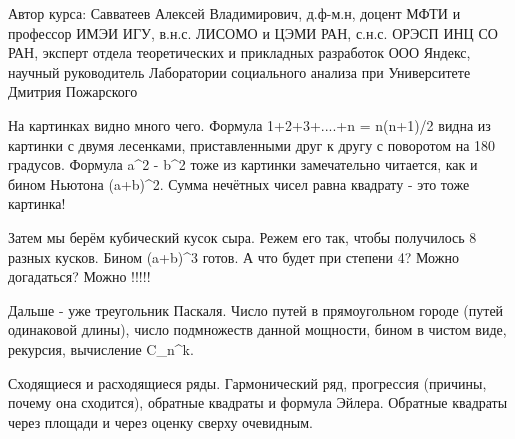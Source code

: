 Автор курса: Савватеев Алексей Владимирович, д.ф-м.н, доцент МФТИ и профессор 
ИМЭИ ИГУ, в.н.с. ЛИСОМО и ЦЭМИ РАН, с.н.с. ОРЭСП ИНЦ СО РАН, эксперт отдела 
теоретических и прикладных разработок ООО Яндекс, научный руководитель 
Лаборатории социального анализа при Университете Дмитрия Пожарского


На картинках видно много чего. Формула 1+2+3+....+n = n(n+1)/2
видна из картинки с двумя лесенками, приставленными друг к
другу с поворотом на 180 градусов. Формула a^2 - b^2 тоже из
картинки замечательно читается, как и бином Ньютона (a+b)^2.
Сумма нечётных чисел равна квадрату - это тоже картинка!

Затем мы берём кубический кусок сыра. Режем его так, чтобы
получилось 8 разных кусков. Бином (a+b)^3 готов. А что будет
при степени 4? Можно догадаться? Можно !!!!!

Дальше - уже треугольник Паскаля. Число путей в прямоугольном
городе (путей одинаковой длины), число подмножеств данной 
мощности, бином в чистом виде, рекурсия, вычисление C_n^k.


Сходящиеся и расходящиеся ряды. Гармонический ряд, прогрессия
(причины, почему она сходится), обратные квадраты и формула Эйлера.
Обратные квадраты через площади и через оценку сверху очевидным.